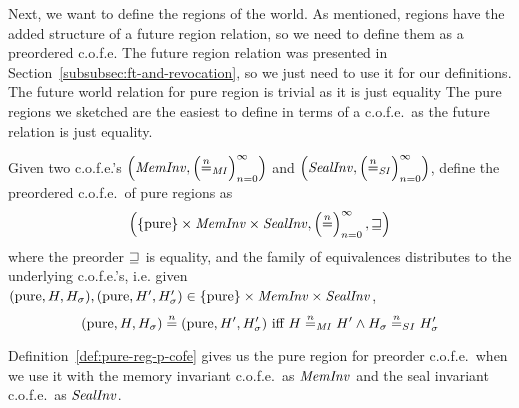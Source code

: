 \begin{jversion}
Next, we want to define the regions of the world.
As mentioned, regions have the added structure of a future region relation, so we need to define them as a preordered c.o.f.e.
The future region relation was presented in Section~\ref{subsubsec:ft-and-revocation}, so we just need to use it for our definitions.
The future world relation for pure region is trivial as it is just equality
The pure regions we sketched are the easiest to define in terms of a c.o.f.e.\ as the future relation is just equality.
\begin{definition}
  \label{def:pure-reg-p-cofe}
  Given two c.o.f.e.'s $\left(\var{MemInv},\left(\nequal[n]_\var{MI}\right)_{n=0}^{\infty}\right)$ and $\left(\var{SealInv},\left(\nequal[n]_{\var{SI}}\right)_{n=0}^{\infty}\right)$, define the preordered c.o.f.e.\ of pure regions as
  \[
  \left(\{\pure\}\times \var{MemInv} \times \var{SealInv},\left(\nequal[n]\right)_{n=0}^{\infty},\future\right)
  \]
  where the preorder $\future$ is equality, and the family of equivalences distributes to the underlying c.o.f.e.'s, i.e. given $(\pure,H,H_\sigma), (\pure,H',H_\sigma') \in \{\pure\}\times \var{MemInv} \times \var{SealInv}$,
  \[
  (\pure,H,H_\sigma) \nequal (\pure,H',H_\sigma') \text{ iff } H \nequal_\var{MI} H' \wedge H_\sigma \nequal_{SI} H_\sigma'
  \]
\end{definition}
Definition~\ref{def:pure-reg-p-cofe} gives us the pure region for preorder c.o.f.e.\ when we use it with the memory invariant c.o.f.e.\ as $\var{MemInv}$ and the seal invariant c.o.f.e.\ as $\var{SealInv}$.


\end{jversion}
